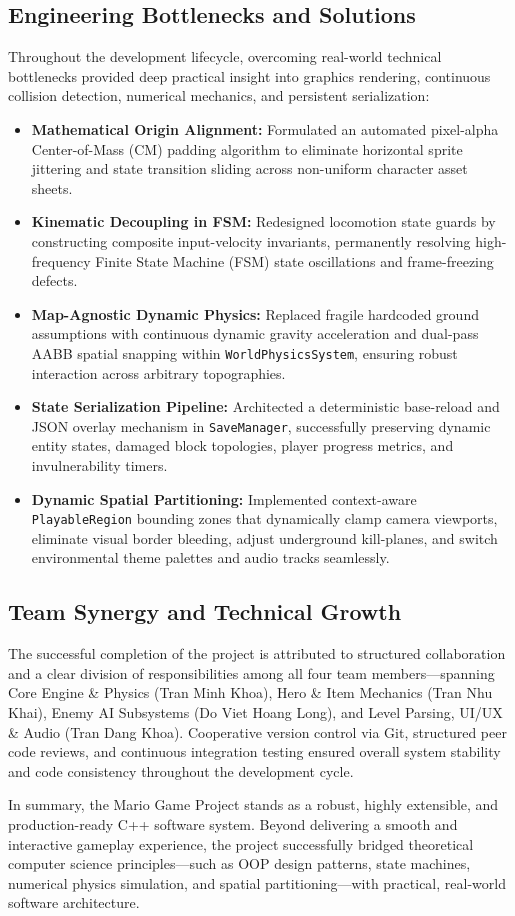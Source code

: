 \subsection{Engineering Bottlenecks and Solutions}
Throughout the development lifecycle, overcoming real-world technical bottlenecks provided deep practical insight into graphics rendering, continuous collision detection, numerical mechanics, and persistent serialization:
\begin{itemize}
    \item \textbf{Mathematical Origin Alignment:} Formulated an automated pixel-alpha Center-of-Mass (CM) padding algorithm to eliminate horizontal sprite jittering and state transition sliding across non-uniform character asset sheets.
    \item \textbf{Kinematic Decoupling in FSM:} Redesigned locomotion state guards by constructing composite input-velocity invariants, permanently resolving high-frequency Finite State Machine (FSM) state oscillations and frame-freezing defects.
    \item \textbf{Map-Agnostic Dynamic Physics:} Replaced fragile hardcoded ground assumptions with continuous dynamic gravity acceleration and dual-pass AABB spatial snapping within \texttt{World\-Physics\-System}, ensuring robust interaction across arbitrary topographies.
    \item \textbf{State Serialization Pipeline:} Architected a deterministic base-reload and JSON overlay mechanism in \texttt{SaveManager}, successfully preserving dynamic entity states, damaged block topologies, player progress metrics, and invulnerability timers.
    \item \textbf{Dynamic Spatial Partitioning:} Implemented context-aware \texttt{PlayableRegion} bounding zones that dynamically clamp camera viewports, eliminate visual border bleeding, adjust underground kill-planes, and switch environmental theme palettes and audio tracks seamlessly.
\end{itemize}

\subsection{Team Synergy and Technical Growth}
The successful completion of the project is attributed to structured collaboration and a clear division of responsibilities among all four team members—spanning Core Engine \& Physics (Tran Minh Khoa), Hero \& Item Mechanics (Tran Nhu Khai), Enemy AI Subsystems (Do Viet Hoang Long), and Level Parsing, UI/UX \& Audio (Tran Dang Khoa). Cooperative version control via Git, structured peer code reviews, and continuous integration testing ensured overall system stability and code consistency throughout the development cycle.

In summary, the Mario Game Project stands as a robust, highly extensible, and production-ready C++ software system. Beyond delivering a smooth and interactive gameplay experience, the project successfully bridged theoretical computer science principles—such as OOP design patterns, state machines, numerical physics simulation, and spatial partitioning—with practical, real-world software architecture.